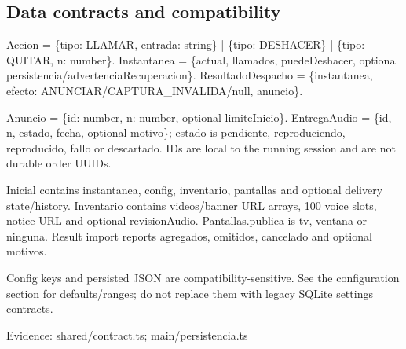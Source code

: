 \subsection{Data contracts and compatibility}

Accion = \{tipo: LLAMAR, entrada: string\} | \{tipo: DESHACER\} | \{tipo: QUITAR, n: number\}. Instantanea = \{actual, llamados, puedeDeshacer, optional persistencia/advertenciaRecuperacion\}. ResultadoDespacho = \{instantanea, efecto: ANUNCIAR/CAPTURA\_INVALIDA/null, anuncio\}.

Anuncio = \{id: number, n: number, optional limiteInicio\}. EntregaAudio = \{id, n, estado, fecha, optional motivo\}; estado is pendiente, reproduciendo, reproducido, fallo or descartado. IDs are local to the running session and are not durable order UUIDs.

Inicial contains instantanea, config, inventario, pantallas and optional delivery state/history. Inventario contains videos/banner URL arrays, 100 voice slots, notice URL and optional revisionAudio. Pantallas.publica is tv, ventana or ninguna. Result import reports agregados, omitidos, cancelado and optional motivos.

Config keys and persisted JSON are compatibility-sensitive. See the configuration section for defaults/ranges; do not replace them with legacy SQLite settings contracts.

Evidence: shared/contract.ts; main/persistencia.ts
